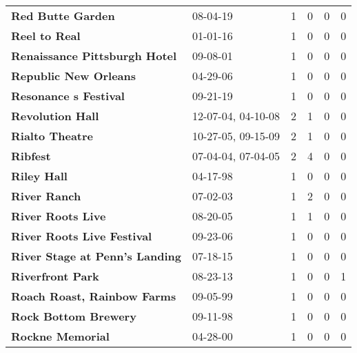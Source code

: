 \begin{supertabular}{p{0.4\textwidth}p{0.3\textwidth}p{0.05\textwidth}p{0.05\textwidth}p{0.05\textwidth}p{0.05\textwidth}}
                                            \textbf{Red Butte Garden} &            08-04-19 &  1 &  0 &  0 &  0 \\
                                                \textbf{Reel to Real} &            01-01-16 &  1 &  0 &  0 &  0 \\
                                \textbf{Renaissance Pittsburgh Hotel} &            09-08-01 &  1 &  0 &  0 &  0 \\
                                        \textbf{Republic New Orleans} &            04-29-06 &  1 &  0 &  0 &  0 \\
                                        \textbf{Resonance s Festival} &            09-21-19 &  1 &  0 &  0 &  0 \\
                                             \textbf{Revolution Hall} &  12-07-04, 04-10-08 &  2 &  1 &  0 &  0 \\
                                              \textbf{Rialto Theatre} &  10-27-05, 09-15-09 &  2 &  1 &  0 &  0 \\
                                                     \textbf{Ribfest} &  07-04-04, 07-04-05 &  2 &  4 &  0 &  0 \\
                                                  \textbf{Riley Hall} &            04-17-98 &  1 &  0 &  0 &  0 \\
                                                 \textbf{River Ranch} &            07-02-03 &  1 &  2 &  0 &  0 \\
                                            \textbf{River Roots Live} &            08-20-05 &  1 &  1 &  0 &  0 \\
                                   \textbf{River Roots Live Festival} &            09-23-06 &  1 &  0 &  0 &  0 \\
                               \textbf{River Stage at Penn's Landing} &            07-18-15 &  1 &  0 &  0 &  0 \\
                                             \textbf{Riverfront Park} &            08-23-13 &  1 &  0 &  0 &  1 \\
                                  \textbf{Roach Roast, Rainbow Farms} &            09-05-99 &  1 &  0 &  0 &  0 \\
                                         \textbf{Rock Bottom Brewery} &            09-11-98 &  1 &  0 &  0 &  0 \\
                                             \textbf{Rockne Memorial} &            04-28-00 &  1 &  0 &  0 &  0 \\

\end{supertabular}
